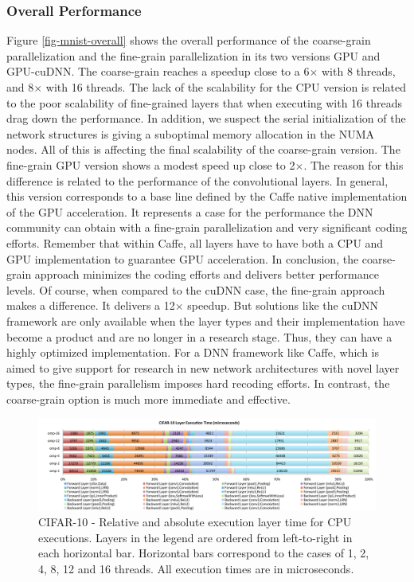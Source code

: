 
\subsubsection{Overall Performance}
Figure \ref{fig-mnist-overall} shows the overall performance of
the coarse-grain parallelization and the fine-grain parallelization in 
its two versions GPU and GPU-cuDNN. The coarse-grain reaches a speedup 
close to a 6$\times$ with 8 threads, and 8$\times$ with 16 threads. The lack of 
the scalability for the CPU version is related to the poor scalability 
of fine-grained layers that when executing with 16 threads drag down 
the performance. In addition, we suspect the serial initialization of 
the network structures is giving a suboptimal memory allocation in 
the NUMA nodes. All of this is affecting the final scalability of 
the coarse-grain version. The fine-grain GPU version shows a 
modest speed up close to 2$\times$. The reason for this difference is related 
to the performance of the convolutional layers. In general, this version 
corresponds to a base line defined by the Caffe native implementation 
of the GPU acceleration. It represents a case for the performance the DNN 
community can obtain with a fine-grain parallelization and very significant 
coding efforts. Remember that within Caffe, all layers have to have 
both a CPU and GPU implementation to guarantee GPU acceleration. 
In conclusion, the coarse-grain approach minimizes the coding efforts 
and delivers better performance levels. Of course, when compared to 
the cuDNN case, the fine-grain approach makes a difference. 
It delivers a 12$\times$ speedup. But solutions like the cuDNN framework are 
only available when the layer types and their implementation have become 
a product and are no longer in a research stage. Thus, they can have a 
highly optimized implementation. For a DNN framework like Caffe, 
which is aimed to give support for research in new network architectures 
with novel layer types, the fine-grain parallelism imposes hard recoding 
efforts. In contrast, the coarse-grain option is much more immediate and 
effective.

\begin{figure}[]
\includegraphics[width=\textwidth]{figures/cifar-abs-rel-time.pdf}
\caption{CIFAR-10 - Relative and absolute execution layer time for CPU executions. Layers in the legend are ordered from left-to-right in each horizontal bar. Horizontal bars correspond to the cases of 1, 2, 4, 8, 12 and 16 threads. All execution times are in microseconds.}
\label{fig-cifar-abs-rel}
\end{figure}

